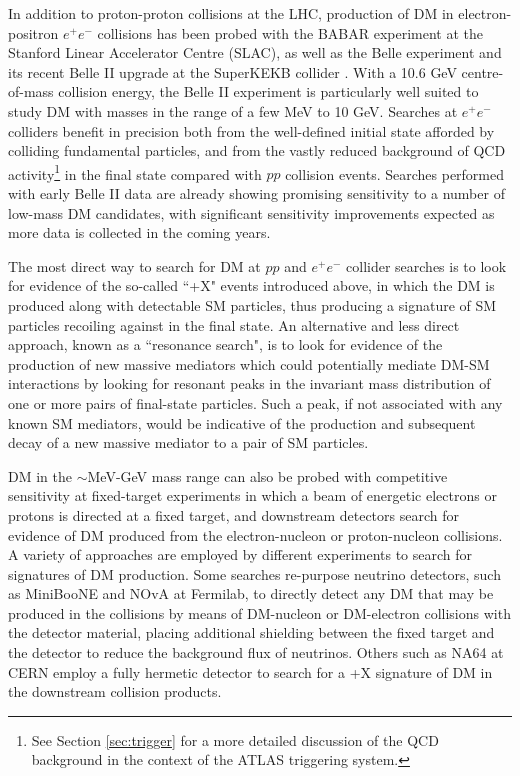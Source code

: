 In addition to proton-proton collisions at the LHC, production of DM in electron-positron \(e^+e^-\) collisions has been probed with the BABAR experiment \cite{babar_2002,babar_dm_2020} at the Stanford Linear Accelerator Centre (SLAC), as well as the Belle experiment \cite{belle_detector_2002} and its recent Belle II upgrade \cite{Robertson_2019} at the SuperKEKB collider \cite{superkekb_2018}. With a 10.6 GeV centre-of-mass collision energy, the Belle II experiment is particularly well suited to study DM with masses in the range of a few MeV to 10 GeV. Searches at \(e^+e^-\) colliders benefit in precision both from the well-defined initial state afforded by colliding fundamental particles, and from the vastly reduced background of QCD activity\footnote{See Section \ref{sec:trigger} for a more detailed discussion of the QCD background in the context of the ATLAS triggering system.} in the final state compared with \(pp\) collision events. Searches performed with early Belle II data \cite{Campajola_2021} are already showing promising sensitivity to a number of low-mass DM candidates, with significant sensitivity improvements expected as more data is collected in the coming years.

The most direct way to search for DM at \(pp\) and \(e^+e^-\) collider searches is to look for evidence of the so-called ``\met+X" events introduced above, in which the DM is produced along with detectable SM particles, thus producing a signature of SM particles recoiling against \met in the final state. An alternative and less direct approach, known as a ``resonance search", is to look for evidence of the production of new massive mediators which could potentially mediate DM-SM interactions by looking for resonant peaks in the invariant mass distribution of one or more pairs of final-state particles. Such a peak, if not associated with any known SM mediators, would be indicative of the production and subsequent decay of a new massive mediator to a pair of SM particles.

DM in the \(\sim\)MeV-GeV mass range can also be probed with competitive sensitivity at fixed-target experiments in which a beam of energetic electrons or protons is directed at a fixed target, and downstream detectors search for evidence of DM produced from the electron-nucleon or proton-nucleon collisions. A variety of approaches are employed by different experiments to search for signatures of DM production. Some searches re-purpose neutrino detectors, such as MiniBooNE \cite{miniboone_2018} and NOvA \cite{nova_2017} at Fermilab, to directly detect any DM that may be produced in the collisions by means of DM-nucleon or DM-electron collisions with the detector material, placing additional shielding between the fixed target and the detector to reduce the background flux of neutrinos. Others such as NA64 \cite{na64_2019} at CERN employ a fully hermetic detector to search for a \met+X signature of DM in the downstream collision products.

